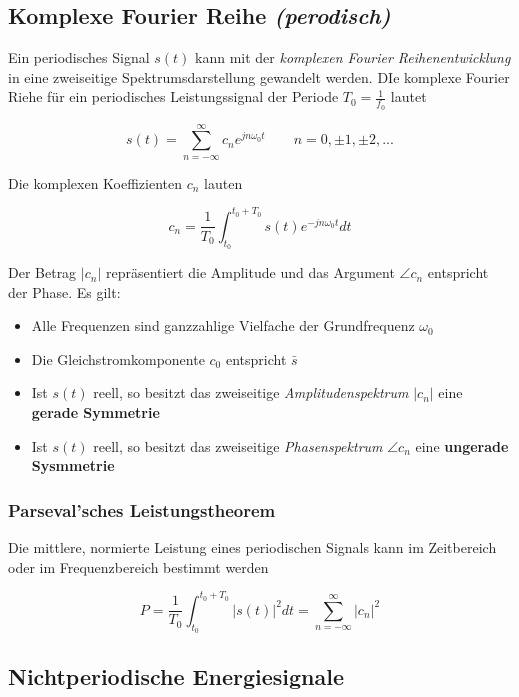 \documentclass[
  10pt,
  a4paper,
  german]{article}
\numberwithin{equation}{section}
\begin{document}
\hypertarget{komplexe-fourier-reihe-perodisch}{%
\subsection{\texorpdfstring{Komplexe Fourier Reihe
\emph{(perodisch)}}{Komplexe Fourier Reihe (perodisch)}}\label{komplexe-fourier-reihe-perodisch}}

Ein periodisches Signal \(s(t)\) kann mit der \emph{komplexen Fourier
Reihenentwicklung} in eine zweiseitige Spektrumsdarstellung gewandelt
werden. DIe komplexe Fourier Riehe für ein periodisches Leistungssignal
der Periode \(T_0=\frac{1}{f_0}\) lautet

\[
s(t)=\sum_{n=-\infty}^{\infty}{c_ne^{jn\omega_0t}}\qquad n=0,\pm1,\pm2,...
\]

Die komplexen Koeffizienten \(c_n\) lauten

\[
c_n=\frac{1}{T_0}\int_{t_0}^{t_0+T_0}{s(t)e^{-jn\omega_0t}dt}
\]

Der Betrag \(|c_n|\) repräsentiert die Amplitude und das Argument
\(\angle c_n\) entspricht der Phase. Es gilt:

\begin{itemize}
\item
  Alle Frequenzen sind ganzzahlige Vielfache der Grundfrequenz
  \(\omega_0\)
\item
  Die Gleichstromkomponente \(c_0\) entspricht \(\bar{s}\)
\item
  Ist \(s(t)\) reell, so besitzt das zweiseitige
  \emph{Amplitudenspektrum} \(|c_n|\) eine \textbf{gerade Symmetrie}
\item
  Ist \(s(t)\) reell, so besitzt das zweiseitige \emph{Phasenspektrum}
  \(\angle c_n\) eine \textbf{ungerade Sysmmetrie}
\end{itemize}

\hypertarget{parsevalsches-leistungstheorem}{%
\subsubsection{Parseval'sches
Leistungstheorem}\label{parsevalsches-leistungstheorem}}

Die mittlere, normierte Leistung eines periodischen Signals kann im
Zeitbereich oder im Frequenzbereich bestimmt werden

\[
P=\frac{1}{T_0}\int_{t_0}^{t_0+T_0}{|s(t)|^2dt}=\sum_{n=-\infty}^{\infty}{|c_n|^2}
\]

\hypertarget{nichtperiodische-energiesignale}{%
\subsection{Nichtperiodische
Energiesignale}\label{nichtperiodische-energiesignale}}
\end{document}

